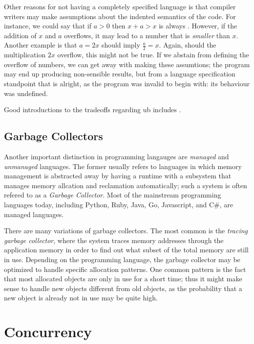 Other reasons for not having a completely specified language is that compiler writers may make
assumptions about the indented semantics of the code. For instance, we could say that if $a > 0$
then $x + a > x$ is always . However, if the addition of $x$ and $a$ overflows, it may
lead to a number that is \emph{smaller} than $x$. Another example is that $a = 2x$ should imply
$\frac{a}{2} = x$. Again, should the multiplication $2x$ overflow, this might not be true.
If we abstain from defining the overflow of numbers, we can get away with making these assumtions;
the program may end up producing non-sensible results, but from a language specification standpoint
that is alright, as the program was invalid to begin with: its behaviour was undefined.

Good introductions to the tradeoffs regarding \gls{ub} includes
\cite{regehr2017undefined,carruth2016garbage}.



\subsection{Garbage Collectors}

Another important distinction in programming langauges are \emph{managed} and \emph{unmanaged}
languages. The former usually refers to languages in which memory management is abstracted away by
having a runtime with a subsystem that manages memory allcation and reclamation automatically; such
a system is often refered to as a \emph{Garbage Collector}. Most of the mainstream programming
languages today, including Python, Ruby, Java, Go, Javascript, and C\#, are managed languages.

There are many variations of garbage collectors. The most common is the \emph{tracing garbage
collector}, where the system traces memory addresses through the application memory in order to
find out what subset of the total memory are still in use. Depending on the programming language,
the garbage collector may be optimized to handle specific allocation patterns. One common pattern
is the fact that most allocated objects are only in use for a short time; thus it might make sense
to handle new objects different from old objects, as the probability that a new object is already
not in use may be quite high.



\section{Concurrency}

